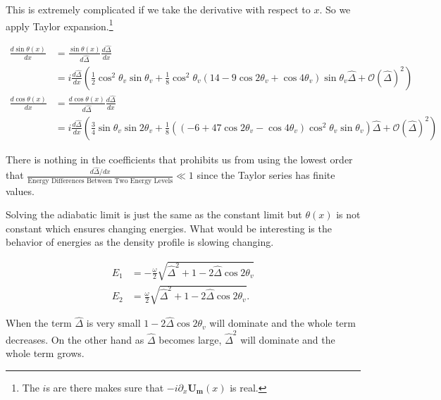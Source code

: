 \documentclass{tufte-handout}
\begin{document}
This is extremely complicated if we take the derivative with respect to $x$. So we apply Taylor expansion.\footnote{The $i$s are there makes sure that $-i\partial_x \mathbf{U_m}(x)$ is real.}

\begin{align*}
\frac{d \sin \theta(x)}{dx} &= \frac{\sin \theta(x)}{d\hat\Delta}\frac{d\hat\Delta}{dx} \\
& = i \frac{d\hat\Delta}{dx} \left(  \frac{1}{2}\cos^2\theta_v\sin\theta_v +  \frac{1}{8} \cos^2\theta_v ( 14-9\cos 2\theta_v + \cos 4\theta_v  ) \sin \theta_v \hat\Delta + \mathcal{O} ( \hat \Delta )^2 \right) \\
\frac{d\cos\theta(x)}{dx} & = \frac{d\cos\theta(x)}{d\hat\Delta}\frac{d\hat\Delta}{dx} \\
& = i \frac{d\hat\Delta}{dx}\left(  \frac{3}{4} \sin\theta_v \sin 2\theta_v + \frac{1}{8} ( (-6+47\cos 2\theta_v - \cos 4\theta_v) \cos^2\theta_v  \sin\theta_v)  \hat \Delta + \mathcal{O}(\hat \Delta)^2  \right)
\end{align*}

There is nothing in the coefficients that prohibits us from using the lowest order that $\frac{d\hat\Delta /dx}{\text{Energy Differences Between Two Energy Levels}}\ll 1$ since the Taylor series has finite values.

Solving the adiabatic limit is just the same as the constant limit but $\theta(x)$ is not constant which ensures changing energies. What would be interesting is the behavior of energies as the density profile is slowing changing.

\begin{align*}
E_1 & = -\frac{\omega}{2}\sqrt{\hat\Delta^2 + 1 - 2 \hat\Delta  \cos 2\theta_v} \\
E_2 & = \frac{\omega}{2}\sqrt{\hat\Delta^2 + 1 - 2 \hat\Delta  \cos 2\theta_v}.
\end{align*}

When the term $\hat\Delta$ is very small $1-2\hat\Delta\cos 2\theta_v$ will dominate and the whole term decreases. On the other hand as $\hat\Delta$ becomes large, $\hat\Delta^2$ will dominate and the whole term grows.
\end{document}

